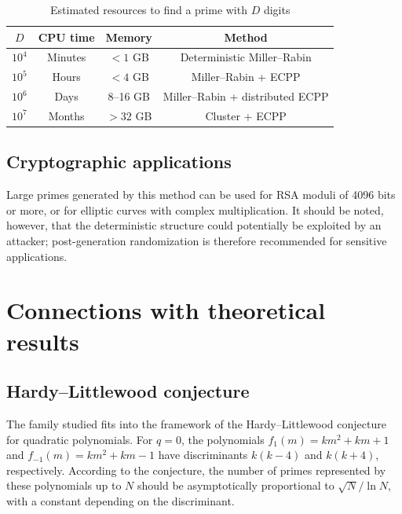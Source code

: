 \documentclass[11pt,a4paper]{article}
\theoremstyle{definition}
\theoremstyle{plain}
\def\textbf#1{#1}%
\begin{document}
\begin{table}[H]
\centering
\caption{Estimated resources to find a prime with $D$ digits}
\label{tab:resources}
\begin{tabular}{@{}cccc@{}}
\toprule
\textbf{$D$} & \textbf{CPU time} & \textbf{Memory} & \textbf{Method} \\
\midrule
$10^4$ & Minutes & $< 1$ GB & Deterministic Miller--Rabin \\
$10^5$ & Hours & $< 4$ GB & Miller--Rabin + ECPP \\
$10^6$ & Days & 8--16 GB & Miller--Rabin + distributed ECPP \\
$10^7$ & Months & $> 32$ GB & Cluster + ECPP \\
\bottomrule
\end{tabular}
\end{table}

\subsection{Cryptographic applications}

Large primes generated by this method can be used for RSA moduli of 4096 bits or more, or for elliptic curves with complex multiplication. It should be noted, however, that the deterministic structure could potentially be exploited by an attacker; post-generation randomization is therefore recommended for sensitive applications.

\section{Connections with theoretical results}

\subsection{Hardy--Littlewood conjecture}

The family studied fits into the framework of the Hardy--Littlewood conjecture for quadratic polynomials. For $q=0$, the polynomials $f_1(m)=km^2+km+1$ and $f_{-1}(m)=km^2+km-1$ have discriminants $k(k-4)$ and $k(k+4)$, respectively. According to the conjecture, the number of primes represented by these polynomials up to $N$ should be asymptotically proportional to $\sqrt{N}/\ln N$, with a constant depending on the discriminant.
\end{document}
